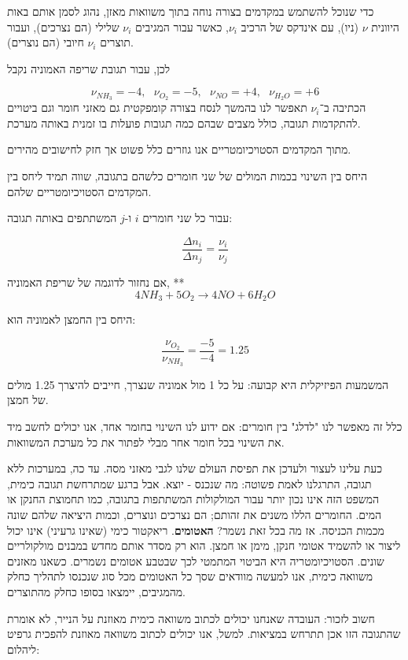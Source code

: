 \documentclass[
  hebrew,
  letterpaper,
  DIV=11,
  numbers=noendperiod]{scrreprt}
\begin{document}
כדי שנוכל להשתמש במקדמים בצורה נוחה בתוך משוואות מאזן, נהוג לסמן אותם
באות היוונית \(\nu\) (ניו), עם אינדקס של הרכיב \(\nu_{i}\), כאשר עבור
המגיבים \(\nu_{i}\) שלילי (הם נצרכים), ועבור תוצרים \(\nu_{i}\) חיובי
(הם נוצרים).

לכן, עבור תגובת שריפה האמוניה נקבל

\[\nu_{NH_{3}} = - 4,\ \ \ \nu_{O_{2}} = - 5,\ \ \ \nu_{NO} = + 4,\ \ \ \nu_{H_{2}O} = + 6\]
הכתיבה ב־\(\nu_{i}\) תאפשר לנו בהמשך לנסח בצורה קומפקטית גם מאזני חומר
וגם ביטויים להתקדמות תגובה, כולל מצבים שבהם כמה תגובות פועלות בו זמנית
באותה מערכת.

מתוך המקדמים הסטויכיומטריים אנו גוזרים כלל פשוט אך חזק לחישובים מהירים.

היחס בין השינוי בכמות המולים של שני חומרים כלשהם בתגובה, שווה תמיד ליחס
בין המקדמים הסטויכיומטריים שלהם.

עבור כל שני חומרים \(i\) ו-\(j\) המשתתפים באותה תגובה:

\[\frac{\Delta n_{i}}{\Delta n_{j}} = \frac{\nu_{i}}{\nu_{j}}\]

אם נחזור לדוגמה של שריפת האמוניה, **
\[4{NH}_{3} + 5O_{2} \longrightarrow 4NO + 6H_{2}O\]

היחס בין החמצן לאמוניה הוא:

\[\frac{\nu_{O_{2}}}{\nu_{NH_{3}}} = \frac{- 5}{- 4} = 1.25\]

המשמעות הפיזיקלית היא קבועה: על כל 1 מול אמוניה שנצרך, חייבים להיצרך
1.25 מולים של חמצן.

כלל זה מאפשר לנו "לדלג" בין חומרים: אם ידוע לנו השינוי בחומר אחד, אנו
יכולים לחשב מיד את השינוי בכל חומר אחר מבלי לפתור את כל מערכת המשוואות.

כעת עלינו לעצור ולעדכן את תפיסת העולם שלנו לגבי מאזני מסה. עד כה,
במערכות ללא תגובה, התרגלנו לאמת פשוטה: \textquotesingle מה שנכנס -
יוצא\textquotesingle. אבל ברגע שמתרחשת תגובה כימית, המשפט הזה אינו נכון
יותר עבור המולקולות המשתתפות בתגובה, כמו תחמוצת החנקן או המים. החומרים
הללו משנים את זהותם; הם נצרכים ונוצרים, וכמות היציאה שלהם שונה מכמות
הכניסה. אז מה בכל זאת נשמר? \textbf{האטומים}. ריאקטור כימי (שאינו
גרעיני) אינו יכול ליצור או להשמיד אטומי חנקן, מימן או חמצן. הוא רק מסדר
אותם מחדש במבנים מולקולריים שונים. הסטויכיומטריה היא הביטוי המתמטי לכך
שבטבע אטומים נשמרים. כשאנו מאזנים משוואה כימית, אנו למעשה מוודאים שסך כל
האטומים מכל סוג שנכנסו לתהליך כחלק מהמגיבים, יימצאו בסופו כחלק מהתוצרים.

חשוב לזכור: העובדה שאנחנו יכולים לכתוב משוואה כימית מאוזנת על הנייר, לא
אומרת שהתגובה הזו אכן תתרחש במציאות. למשל, אנו יכולים לכתוב משוואה
מאוזנת להפכית גרפיט ליהלום:
\end{document}
